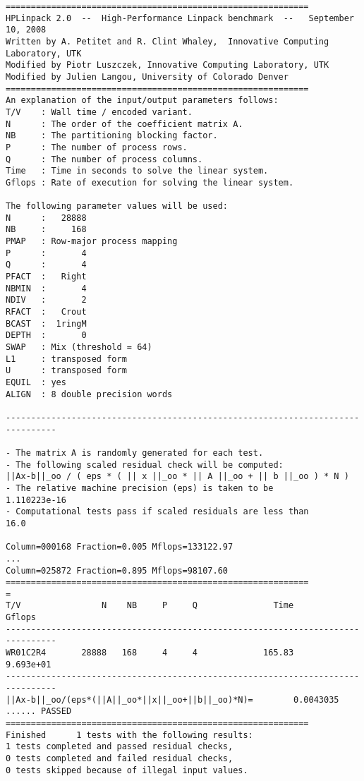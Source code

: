 \documentclass[a4paper]{report}
\begin{document}
\begin{verbatim}
============================================================
HPLinpack 2.0  --  High-Performance Linpack benchmark  --   September 10, 2008
Written by A. Petitet and R. Clint Whaley,  Innovative Computing Laboratory, UTK
Modified by Piotr Luszczek, Innovative Computing Laboratory, UTK
Modified by Julien Langou, University of Colorado Denver
============================================================
An explanation of the input/output parameters follows:
T/V    : Wall time / encoded variant.
N      : The order of the coefficient matrix A.
NB     : The partitioning blocking factor.
P      : The number of process rows.
Q      : The number of process columns.
Time   : Time in seconds to solve the linear system.
Gflops : Rate of execution for solving the linear system.

The following parameter values will be used:
N      :   28888
NB     :     168
PMAP   : Row-major process mapping
P      :       4
Q      :       4
PFACT  :   Right
NBMIN  :       4
NDIV   :       2
RFACT  :   Crout
BCAST  :  1ringM
DEPTH  :       0
SWAP   : Mix (threshold = 64)
L1     : transposed form
U      : transposed form
EQUIL  : yes
ALIGN  : 8 double precision words

--------------------------------------------------------------------------------

- The matrix A is randomly generated for each test.
- The following scaled residual check will be computed:
||Ax-b||_oo / ( eps * ( || x ||_oo * || A ||_oo + || b ||_oo ) * N )
- The relative machine precision (eps) is taken to be               1.110223e-16
- Computational tests pass if scaled residuals are less than                16.0

Column=000168 Fraction=0.005 Mflops=133122.97
...
Column=025872 Fraction=0.895 Mflops=98107.60
============================================================
=
T/V                N    NB     P     Q               Time                 Gflops
--------------------------------------------------------------------------------
WR01C2R4       28888   168     4     4             165.83              9.693e+01
--------------------------------------------------------------------------------
||Ax-b||_oo/(eps*(||A||_oo*||x||_oo+||b||_oo)*N)=        0.0043035 ...... PASSED
============================================================
Finished      1 tests with the following results:
1 tests completed and passed residual checks,
0 tests completed and failed residual checks,
0 tests skipped because of illegal input values.
\end{verbatim}
\end{document}
